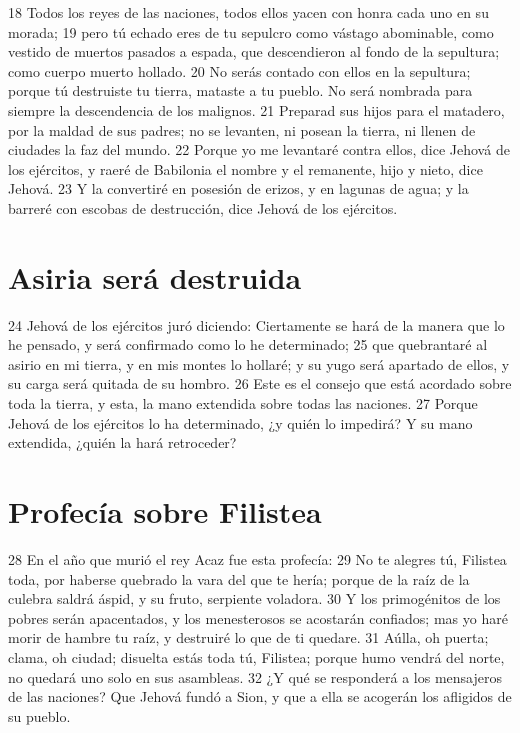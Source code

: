 18 Todos los reyes de las naciones, todos ellos yacen con honra cada uno en su morada;
19 pero tú echado eres de tu sepulcro como vástago abominable, como vestido de muertos pasados a espada, que descendieron al fondo de la sepultura; como cuerpo muerto hollado.
20 No serás contado con ellos en la sepultura; porque tú destruiste tu tierra, mataste a tu pueblo. No será nombrada para siempre la descendencia de los malignos.
21 Preparad sus hijos para el matadero, por la maldad de sus padres; no se levanten, ni posean la tierra, ni llenen de ciudades la faz del mundo.
22 Porque yo me levantaré contra ellos, dice Jehová de los ejércitos, y raeré de Babilonia el nombre y el remanente, hijo y nieto, dice Jehová.
23 Y la convertiré en posesión de erizos, y en lagunas de agua; y la barreré con escobas de destrucción, dice Jehová de los ejércitos. 

\section*{Asiria será destruida}

24 Jehová de los ejércitos juró diciendo: Ciertamente se hará de la manera que lo he pensado, y será confirmado como lo he determinado;
25 que quebrantaré al asirio en mi tierra, y en mis montes lo hollaré; y su yugo será apartado de ellos, y su carga será quitada de su hombro.
26 Este es el consejo que está acordado sobre toda la tierra, y esta, la mano extendida sobre todas las naciones.
27 Porque Jehová de los ejércitos lo ha determinado, ¿y quién lo impedirá? Y su mano extendida, ¿quién la hará retroceder?

\section*{Profecía sobre Filistea}

28 En el año que murió el rey Acaz fue esta profecía:
29 No te alegres tú, Filistea toda, por haberse quebrado la vara del que te hería; porque de la raíz de la culebra saldrá áspid, y su fruto, serpiente voladora.
30 Y los primogénitos de los pobres serán apacentados, y los menesterosos se acostarán confiados; mas yo haré morir de hambre tu raíz, y destruiré lo que de ti quedare.
31 Aúlla, oh puerta; clama, oh ciudad; disuelta estás toda tú, Filistea; porque humo vendrá del norte, no quedará uno solo en sus asambleas.
32 ¿Y qué se responderá a los mensajeros de las naciones? Que Jehová fundó a Sion, y que a ella se acogerán los afligidos de su pueblo.

